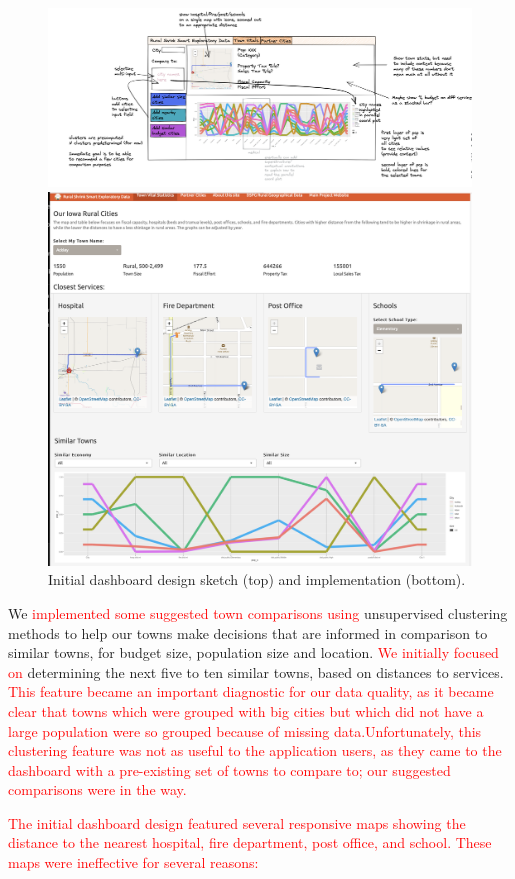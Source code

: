 \documentclass[letterpaper,inpress]{jdsart}
\begin{document}
\begin{figure}
\centering
\includegraphics[width=\textwidth]{Version1}

\includegraphics[width=.7\textwidth]{Version2}
\caption{Initial dashboard design sketch (top) and implementation (bottom).}\label{fig:v1}
\end{figure}

We {\textcolor{red}{implemented some suggested town comparisons using}} unsupervised clustering methods to help our towns make decisions that are informed in comparison to similar towns, for budget size, population size and location. {\textcolor{red}{We initially focused on}} determining the next five to ten similar towns, based on distances to services. {\textcolor{red}{This feature became an important diagnostic for our data quality, as it became clear that towns which were grouped with big cities but which did not have a large population were so grouped because of missing data.}}{\textcolor{red}{Unfortunately, this clustering feature was not as useful to the application users, as they came to the dashboard with a pre-existing set of towns to compare to; our suggested comparisons were in the way.}}

{\textcolor{red}{The initial dashboard design featured several responsive maps showing the distance to the nearest hospital, fire department, post office, and school. These maps were ineffective for several reasons: }}
\end{document}
